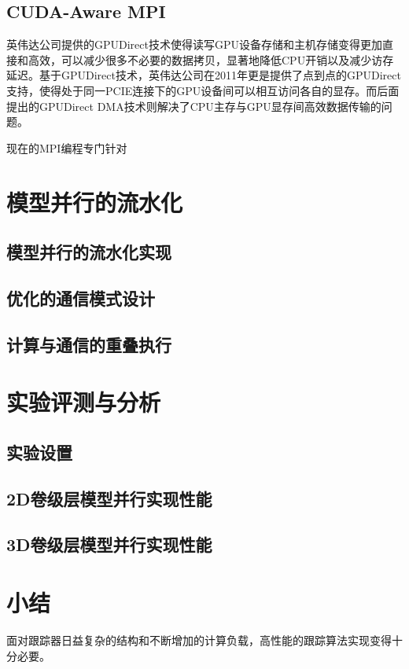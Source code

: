 \subsection{CUDA-Aware MPI}
英伟达公司提供的GPUDirect技术使得读写GPU设备存储和主机存储变得更加直接和高效，可以减少很多不必要的数据拷贝，显著地降低CPU开销以及减少访存延迟。基于GPUDirect技术，英伟达公司在2011年更是提供了点到点的GPUDirect支持，使得处于同一PCIE连接下的GPU设备间可以相互访问各自的显存。而后面提出的GPUDirect DMA技术则解决了CPU主存与GPU显存间高效数据传输的问题。

现在的MPI编程专门针对

\section{模型并行的流水化}

\subsection{模型并行的流水化实现}


\subsection{优化的通信模式设计}


\subsection{计算与通信的重叠执行}

\section{实验评测与分析}

\subsection{实验设置}

\subsection{2D卷级层模型并行实现性能}

\subsection{3D卷级层模型并行实现性能}


\section{小结}
面对跟踪器日益复杂的结构和不断增加的计算负载，高性能的跟踪算法实现变得十分必要。
